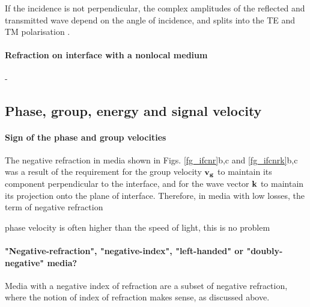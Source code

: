 If the incidence is not perpendicular, the complex amplitudes of the reflected and transmitted wave depend on the angle of incidence, and splits into the TE and TM polarisation \cite[p. 38]{born1999book}.

\paragraph{Refraction on interface with a nonlocal medium}   %
-





\subsection{Phase, group, energy and signal velocity}
\paragraph{Sign of the phase and group velocities}%
The negative refraction in media shown in Figs. \ref{fg_ifcnr}b,c and \ref{fg_ifcnrk}b,c was a result of the requirement for the group velocity ${\mathbf{v_g}}$ to maintain its component perpendicular to the interface, and for the wave vector ${\mathbf{k}}$ to maintain its projection onto the plane of interface. Therefore, in media with low losses, the term of negative refraction 


phase velocity is often higher than the speed of light, this is no problem\\

\paragraph{"Negative-refraction", "negative-index", "left-handed" or "doubly-negative" media?}  %
Media with a negative index of refraction are a subset of negative refraction, where the notion of index of refraction makes sense, as discussed above.

